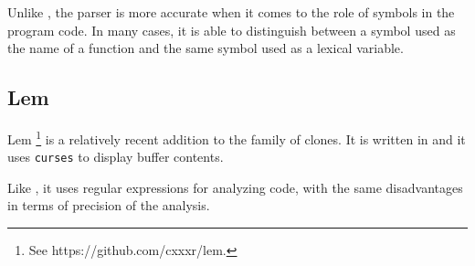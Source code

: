 Unlike \emacs{}, the \climacs{} parser is more accurate when it comes
to the role of symbols in the program code.  In many cases, it is able
to distinguish between a symbol used as the name of a function and the
same symbol used as a lexical variable.

\subsection{Lem}

Lem%
\footnote{See https://github.com/cxxxr/lem.}
is a relatively recent addition to the family of \emacs{} clones.  It
is written in \commonlisp{} and it uses \texttt{curses} to display
buffer contents.

Like \emacs{} , it uses regular expressions
for analyzing \commonlisp{} code, with the same disadvantages in terms
of precision of the analysis.
